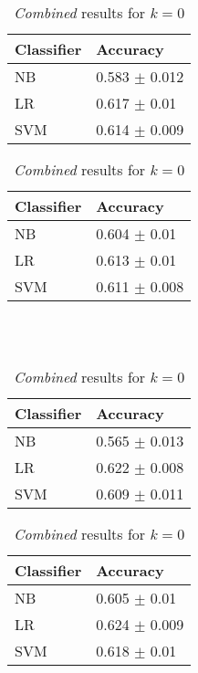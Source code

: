 \begin{table}[h]
\begin{minipage}[b]{.50\textwidth}
\centering
  \begin{tabular}{|l|l|} %
  \hline
  		\textbf{Classifier} & \textbf{Accuracy} \\ \hline
		NB & 0.583 $\pm$ 0.012 \\ \hline
		LR & 0.617 $\pm$ 0.01 \\ \hline
		SVM & 0.614 $\pm$ 0.009 \\ \hline
  \end{tabular}
  \caption{\emph{Traits} results for $k=0$}
\end{minipage}
\begin{minipage}[b]{.50\textwidth}
\centering
  \begin{tabular}{|l|l|} %
  \hline
  		\textbf{Classifier} & \textbf{Accuracy} \\ \hline
		NB & 0.604 $\pm$ 0.01 \\ \hline
		LR & 0.613 $\pm$ 0.01 \\ \hline
		SVM & 0.611 $\pm$ 0.008 \\ \hline
  \end{tabular}
  \caption{\emph{Pages} results for $k=0$}
\end{minipage}
\\
\\
\begin{minipage}[b]{.50\textwidth}
\centering
  \begin{tabular}{|l|l|} %
  \hline
  		\textbf{Classifier} & \textbf{Accuracy} \\ \hline
		NB & 0.565 $\pm$ 0.013 \\ \hline
		LR & 0.622 $\pm$ 0.008 \\ \hline
		SVM & 0.609 $\pm$ 0.011 \\ \hline
  \end{tabular}
  \caption{\emph{Groups} results for $k=0$}
\end{minipage}
\begin{minipage}[b]{.50\textwidth}
\centering
  \begin{tabular}{|l|l|} %
  \hline
  		\textbf{Classifier} & \textbf{Accuracy} \\ \hline
		NB & 0.605 $\pm$ 0.01 \\ \hline
		LR & 0.624 $\pm$ 0.009 \\ \hline
		SVM & 0.618 $\pm$ 0.01 \\ \hline
  \end{tabular}
  \caption{\emph{Combined} results for $k=0$}
\end{minipage}
\end{table}

